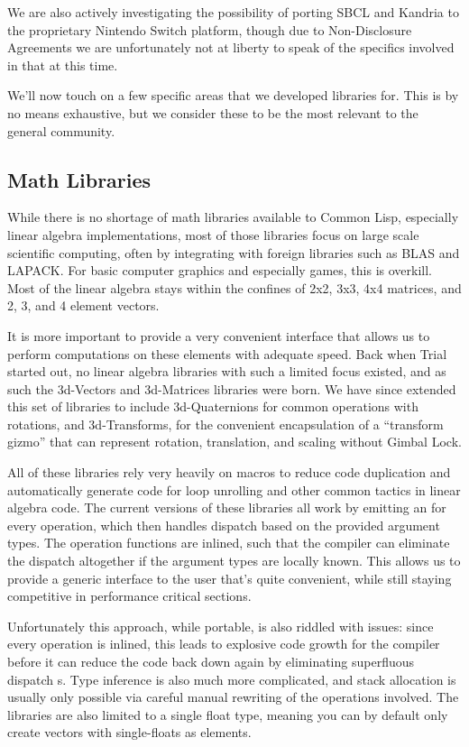 \documentclass[format=sigconf]{acmart}
\begin{document}
We are also actively investigating the possibility of porting SBCL and Kandria to the proprietary Nintendo Switch platform, though due to Non-Disclosure Agreements we are unfortunately not at liberty to speak of the specifics involved in that at this time.

We'll now touch on a few specific areas that we developed libraries for. This is by no means exhaustive, but we consider these to be the most relevant to the general community.

\subsection{Math Libraries}\label{math}
While there is no shortage of math libraries available to Common Lisp, especially linear algebra implementations, most of those libraries focus on large scale scientific computing, often by integrating with foreign libraries such as BLAS and LAPACK. For basic computer graphics and especially games, this is overkill. Most of the linear algebra stays within the confines of 2x2, 3x3, 4x4 matrices, and 2, 3, and 4 element vectors.

It is more important to provide a very convenient interface that allows us to perform computations on these elements with adequate speed. Back when Trial started out, no linear algebra libraries with such a limited focus existed, and as such the 3d-Vectors and 3d-Matrices libraries were born. We have since extended this set of libraries to include 3d-Quaternions for common operations with rotations, and 3d-Transforms, for the convenient encapsulation of a ``transform gizmo'' that can represent rotation, translation, and scaling without Gimbal Lock.

All of these libraries rely very heavily on macros to reduce code duplication and automatically generate code for loop unrolling and other common tactics in linear algebra code. The current versions of these libraries all work by emitting an  for every operation, which then handles dispatch based on the provided argument types. The operation functions are inlined, such that the compiler can eliminate the dispatch altogether if the argument types are locally known. This allows us to provide a generic interface to the user that's quite convenient, while still staying competitive in performance critical sections.

Unfortunately this approach, while portable, is also riddled with issues: since every operation is inlined, this leads to explosive code growth for the compiler before it can reduce the code back down again by eliminating superfluous dispatch s. Type inference is also much more complicated, and stack allocation is usually only possible via careful manual rewriting of the operations involved. The libraries are also limited to a single float type, meaning you can by default only create vectors with single-floats as elements.
\end{document}
